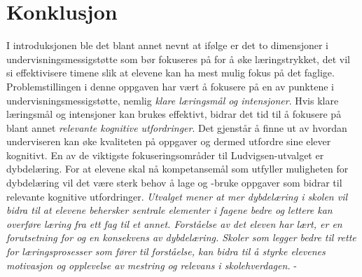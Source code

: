 \documentclass[main.tex]{subfiles}
\begin{document}
\section*{Konklusjon}
\label{sec:6}

I introduksjonen ble det blant annet nevnt at ifølge  er det to dimensjoner i 
undervisningsmessigstøtte som bør fokuseres på for å øke læringstrykket, det vil si effektivisere 
timene slik at elevene kan ha mest mulig fokus på det faglige. Problemstillingen i denne oppgaven har 
vært å fokusere på en av punktene i undervisningsmessigstøtte, nemlig \emph{klare læringsmål og 
intensjoner}. Hvis klare læringsmål og intensjoner kan brukes effektivt, bidrar det tid til å fokusere 
på blant annet \emph{relevante kognitive utfordringer}. Det gjenstår å finne ut av hvordan 
underviseren kan øke kvaliteten på oppgaver og dermed utfordre sine elever kognitivt. En av de 
viktigste fokuseringsområder til Ludvigsen-utvalget er dybdelæring. For at elevene
skal nå kompetansemål som utfyller muligheten for dybdelæring vil det være sterk behov å lage og -bruke 
oppgaver som bidrar til relevante kognitive utfordringer. 
\newline
\newline
\emph{
Utvalget mener at mer dybdelæring i skolen vil bidra til at elevene behersker sentrale elementer
i fagene bedre og lettere kan overføre læring fra ett fag til et annet. Forståelse av det eleven har
lært, er en forutsetning for og en konsekvens av dybdelæring. Skoler som legger bedre til rette for
læringsprosesser som fører til forståelse, kan bidra til å styrke elevenes motivasjon og opplevelse
av mestring og relevans i skolehverdagen.} - 
\end{document}
